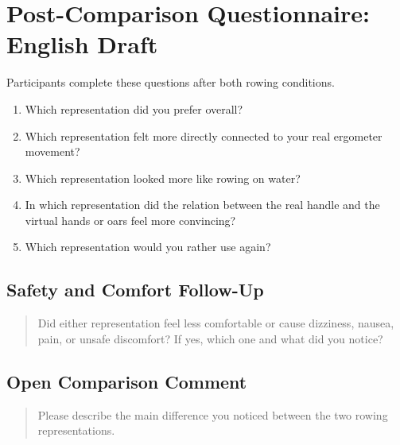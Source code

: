 \section{Post-Comparison Questionnaire: English Draft}
\label{app:questionnaires_post_comparison_english}

Participants complete these questions after both rowing conditions.

\begin{enumerate}
    \item Which representation did you prefer overall?
    \item Which representation felt more directly connected to your real ergometer movement?
    \item Which representation looked more like rowing on water?
    \item In which representation did the relation between the real handle and the virtual hands or oars feel more convincing?
    \item Which representation would you rather use again?
\end{enumerate}

\subsection*{Safety and Comfort Follow-Up}

\begin{quote}
Did either representation feel less comfortable or cause dizziness, nausea, pain, or unsafe discomfort? If yes, which one and what did you notice?
\end{quote}

\subsection*{Open Comparison Comment}

\begin{quote}
Please describe the main difference you noticed between the two rowing representations.
\end{quote}

